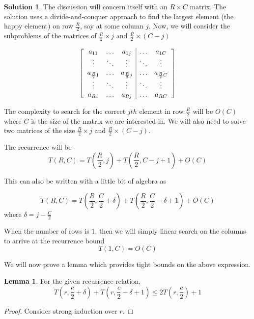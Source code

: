 \documentclass{article}
\theoremstyle{definition}
\newtheorem*{solution}{Solution}
\newtheorem{lemma}{Lemma}
\begin{document}
\begin{solution}
The discussion will concern itself with an $R \times C$ matrix.
The solution uses a divide-and-conquer approach to find the largest element (the happy element) on row $\frac R 2$, say at some column $j$.
Now, we will consider the subproblems of the matrices of $\frac{R}{2} \times j$ and $\frac{R}{2} \times (C - j)$

\[
\left [
\begin{array}{c c c|c c}
a_{11} & \ldots &  a_{1j} & \ldots & a_{1C} \\
\vdots & \ddots & \vdots & \ddots & \vdots \\
a_{\frac{R}{2}1} & \ldots & a_{\frac{R}{2}j} & \ldots & a_{\frac{R}{2}C} \\
\vdots & \ddots & \vdots & \ddots & \vdots \\
a_{R1} & \ldots & a_{Rj} & \ldots & a_{RC}
\end{array}
\right ]
\]

The complexity to search for the correct $jth$ element in row $\frac{R}{2}$ will be $O(C)$ where $C$ is the size of the
matrix we are interested in. We will also need to solve two matrices of the size $\frac{R}{2} \times j$ and $\frac{R}{2} \times (C - j)$.

The recurrence will be
$$
T(R, C) = T\left(\frac{R}{2}, j\right) + T\left(\frac{R}{2}, C - j + 1\right) + O(C)
$$

This can also be written with a little bit of algebra as

$$
T(R, C) = T\left(\frac{R}{2}, \frac{C}{2} + \delta\right) + T\left(\frac{R}{2}, \frac{C}{2} - \delta + 1\right) + O(C)
$$
where $\delta = j - \frac{C}{2}$


When the number of rows is $1$, then we will simply linear search on the columns to arrive at the recurrence bound
$$
T(1, C) = O(C)
$$


We will now prove a lemma which provides tight bounds on the above expression.
\begin{lemma}
For the given recurrence relation, 
$$
T \left(r, \frac{c}{2} + \delta\right) + T \left(r, \frac{c}{2} - \delta + 1 \right) \leq 2T \left(r, \frac{c}{2} \right) + 1
$$
\end{lemma}
\begin{proof}

Consider strong induction over $r$.



\end{proof}
\end{solution}
\end{document}
